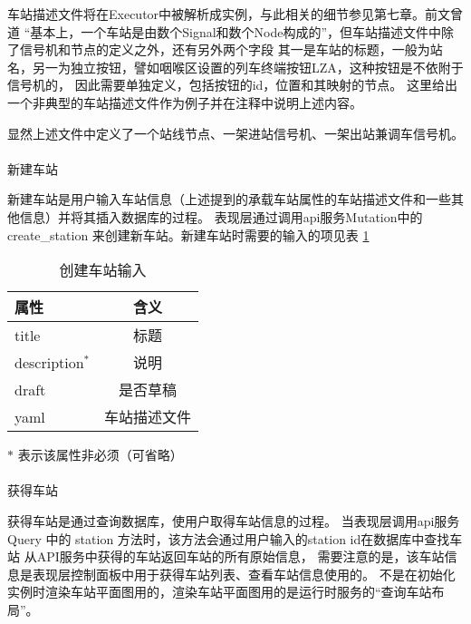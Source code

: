 车站描述文件将在Executor中被解析成实例，与此相关的细节参见第七章。前文曾道
“基本上，一个车站是由数个Signal和数个Node构成的”，但车站描述文件中除了信号机和节点的定义之外，还有另外两个字段
其一是车站的标题，一般为站名，另一为独立按钮，譬如咽喉区设置的列车终端按钮LZA，这种按钮是不依附于信号机的，
因此需要单独定义，包括按钮的id，位置和其映射的节点。
这里给出一个非典型的车站描述文件作为例子并在注释中说明上述内容。

显然上述文件中定义了一个站线节点、一架进站信号机、一架出站兼调车信号机。

\paragraph{}新建车站

新建车站是用户输入车站信息（上述提到的承载车站属性的车站描述文件和一些其他信息）并将其插入数据库的过程。
表现层通过调用api服务Mutation中的 create\_station 来创建新车站。新建车站时需要的输入的项见表 \ref{create_sta_in}

\begin{table}[htpb!]
    \centering
    \caption{\label{create_sta_in}创建车站输入}
    \begin{threeparttable}
        \begin{tabular}{lc}
            \toprule
            属性            & 含义         \\
            \midrule
            title           & 标题         \\
            description$^*$ & 说明         \\
            draft           & 是否草稿     \\
            yaml            & 车站描述文件 \\
            \bottomrule
        \end{tabular}
        \begin{tablenotes}
            \footnotesize
            \item[$*$] 表示该属性非必须（可省略）
        \end{tablenotes}
    \end{threeparttable}
\end{table}

\paragraph{}获得车站

获得车站是通过查询数据库，使用户取得车站信息的过程。
当表现层调用api服务 Query 中的 station 方法时，该方法会通过用户输入的station id在数据库中查找车站
从API服务中获得的车站返回车站的所有原始信息，
需要注意的是，该车站信息是表现层控制面板中用于获得车站列表、查看车站信息使用的。
不是在初始化实例时渲染车站平面图用的，渲染车站平面图用的是运行时服务的“查询车站布局”。

